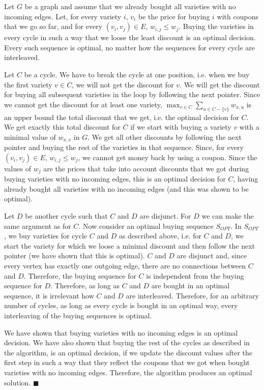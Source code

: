 \documentclass[12pt]{article}
\begin{document}
\begin{frm-thm}
Let $G$ be a graph and assume that we already bought all varieties with no incoming edges. Let, for every variety $i$, $v_i$ be the price for buying $i$ with coupons that we go so far, and for every $(v_i, v_j) \in E$, $w_{i,j} \leq w_j$. Buying the varieties in every cycle in such a way that we loose the least discount is an optimal decision. Every such sequence is optimal, no matter how the sequences for every cycle are interleaved.
\end{frm-thm}
Let $C$ be a cycle. We have to break the cycle at one position, i.e. when we buy the first variety $v \in C$, we will not get the discount for $v$. We will get the discount for buying all subsequent varieties in the loop by following the next pointer. Since we cannot get the discount for at least one variety, $\max_{v \in C} \sum_{u \in C - \{v\}} w_{x,u}$ is an upper bound the total discount that we get, i.e. the optimal decision for $C$. We get exactly this total discount for $C$ if we start with buying a variety $v$ with a minimal value of $w_{x,v}$ in $G$. We get all other discounts by following the next pointer and buying the rest of the varieties in that sequence. Since, for every $(v_i, v_j) \in E$, $w_{i,j} \leq w_j$, we cannot get money back by using a coupon. Since the values of $w_j$ are the prices that take into account discounts that we got during buying varieties with no incoming edges, this is an optimal decision for $C$, having already bought all varieties with no incoming edges (and this was shown to be optimal).

Let $D$ be another cycle such that $C$ and $D$ are disjunct. For $D$ we can make the same argument as for $C$. Now consider an optimal buying sequence $S_\mathit{OPT}$. In $S_\mathit{OPT}$, we buy varieties for cycle $C$ and $D$ as described above, i.e. for $C$ and $D$, we start the variety for which we loose a minimal discount and then follow the next pointer (we have shown that this is optimal). $C$ and $D$ are disjunct and, since every vertex has exactly one outgoing edge, there are no connections between $C$ and $D$. Therefore, the buying sequence for $C$ is independent from the buying sequence for $D$. Therefore, as long as $C$ and $D$ are bought in an optimal sequence, it is irrelevant how $C$ and $D$ are interleaved. Therefore, for an arbitrary number of cycles, as long as every cycle is bought in an optimal way, every interleaving of the buying sequences is optimal.

We have shown that buying varieties with no incoming edges is an optimal decision. We have also shown that buying the rest of the cycles as described in the algorithm, is an optimal decision, if we update the discount values after the first step in such a way that they reflect the coupons that we got when bought varieties with no incoming edges. Therefore, the algorithm produces an optimal solution. \hfill $\blacksquare$
\end{document}
